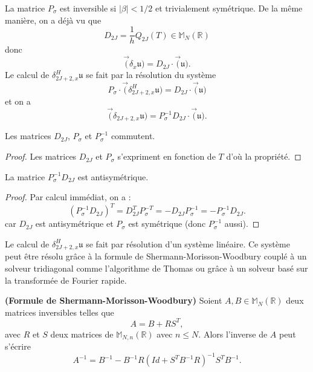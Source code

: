 La matrice $P_{\sigma}$ est inversible si $|\beta |<1/2$ et trivialement symétrique. 
De la même manière, on a déjà vu que 
\begin{equation}
D_{2J} = \dfrac{1}{h} Q_{2J}(T) \in \mathbb{M}_{N}(\mathbb{R})
\end{equation}
donc 
\begin{equation}
\vec (\delta_{x} \mathfrak{u}) = D_{2J} \cdot \vec (\mathfrak{u}).
\end{equation}
Le calcul de $\delta^H_{2J+2,x} \mathfrak{u}$ se fait par la résolution du système
\begin{equation}
P_{\sigma} \cdot \vec (\delta_{2J+2,x}^H \mathfrak{u}) = D_{2J} \cdot \vec (\mathfrak{u})
\label{eq:systhermitien}
\end{equation}
et on a 
\begin{equation}
\vec (\delta_{2J+2,x} \mathfrak{u} ) =P_{\sigma}^{-1} D_{2J} \cdot \vec (\mathfrak{u}).
\end{equation}

\begin{proposition}
Les matrices $D_{2J}$, $P_{\sigma}$ et $P^{-1}_{\sigma}$ commutent.
\end{proposition}

\begin{proof}
Les matrices $D_{2J}$ et $P_{\sigma}$ s'expriment en fonction de $T$ d'où la propriété.
\end{proof}

\begin{proposition}
La matrice $P^{-1}_{\sigma}D_{2J}$ est antisymétrique.
\label{prop:derhermi_antisym}
\end{proposition}

\begin{proof}
Par calcul immédiat, on a :
\begin{equation}
(P^{-1}_{\sigma}D_{2J})^T = D_{2J}^T P_{\sigma}^{-T} = - D_{2J} P_{\sigma}^{-1} = - P_{\sigma}^{-1} D_{2J}.
\end{equation}
car $D_{2J}$ est antisymétrique et $P_{\sigma}$ est symétrique (donc $P^{-1}_{\sigma}$ aussi). 
\end{proof}

Le calcul de $\delta_{2J+2,x}^H \mathfrak{u}$ se fait par résolution d'un système linéaire. Ce système peut être résolu grâce à la formule de Shermann-Morisson-Woodbury couplé à un solveur tridiagonal comme l'algorithme de Thomas ou grâce à un solveur basé sur la transformée de Fourier rapide.

\begin{proposition}
\textbf{(Formule de Shermann-Morisson-Woodbury)} Soient $A, B \in \mathbb{M}_N \left(\mathbb{R} \right)$ deux matrices inversibles telles que 
\begin{equation}
A = B + R S^T,
\end{equation}
avec $R$ et $S$ deux matrices de $\mathbb{M}_{N,n} \left(\mathbb{R} \right)$ avec $n \leq N$.
Alors l'inverse de $A$ peut s'écrire
\begin{equation}
A^{-1} = B^{-1} - B^{-1} R \left( Id + S^T B^{-1} R  \right)^{-1} S^T B^{-1}.
\label{eq:SMW}
\end{equation}
\end{proposition}

